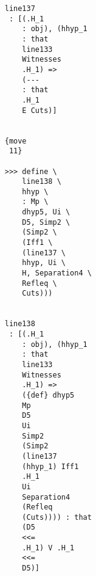 \documentclass[12pt]{article}
\begin{document}
\begin{verbatim}
                                    line137 
                                     : [(.H_1 
                                        : obj), (hhyp_1 
                                        : that 
                                        line133 
                                        Witnesses 
                                        .H_1) => 
                                        (--- 
                                        : that 
                                        .H_1 
                                        E Cuts)]


                                    {move 
                                     11}

                                    >>> define \
                                        line138 \
                                        hhyp \
                                        : Mp \
                                        dhyp5, Ui \
                                        D5, Simp2 \
                                        (Simp2 \
                                        (Iff1 \
                                        (line137 \
                                        hhyp, Ui \
                                        H, Separation4 \
                                        Refleq \
                                        Cuts)))


                                    line138 
                                     : [(.H_1 
                                        : obj), (hhyp_1 
                                        : that 
                                        line133 
                                        Witnesses 
                                        .H_1) => 
                                        ({def} dhyp5 
                                        Mp 
                                        D5 
                                        Ui 
                                        Simp2 
                                        (Simp2 
                                        (line137 
                                        (hhyp_1) Iff1 
                                        .H_1 
                                        Ui 
                                        Separation4 
                                        (Refleq 
                                        (Cuts)))) : that 
                                        (D5 
                                        <<= 
                                        .H_1) V .H_1 
                                        <<= 
                                        D5)]



\end{verbatim}
\end{document}

